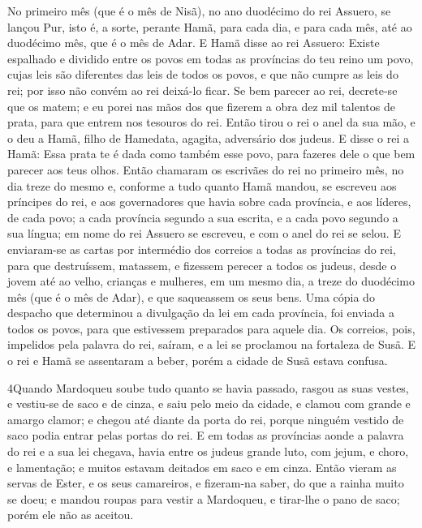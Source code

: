 No primeiro mês (que é o mês de Nisã), no ano duodécimo do rei
Assuero, se lançou Pur, isto é, a sorte, perante Hamã, para cada
dia, e para cada mês, até ao duodécimo mês, que é o mês de Adar.
E Hamã disse ao rei Assuero: Existe espalhado e dividido entre
os povos em todas as províncias do teu reino um povo, cujas leis são
diferentes das leis de todos os povos, e que não cumpre as leis do
rei; por isso não convém ao rei deixá-lo ficar. Se bem parecer
ao rei, decrete-se que os matem; e eu porei nas mãos dos que fizerem
a obra dez mil talentos de prata, para que entrem nos tesouros do
rei. Então tirou o rei o anel da sua mão, e o deu a Hamã,
filho de Hamedata, agagita, adversário dos judeus. E disse o
rei a Hamã: Essa prata te é dada como também esse povo, para fazeres
dele o que bem parecer aos teus olhos. Então chamaram os
escrivães do rei no primeiro mês, no dia treze do mesmo e, conforme
a tudo quanto Hamã mandou, se escreveu aos príncipes do rei, e aos
governadores que havia sobre cada província, e aos líderes, de cada
povo; a cada província segundo a sua escrita, e a cada povo segundo
a sua língua; em nome do rei Assuero se escreveu, e com o anel do
rei se selou. E enviaram-se as cartas por intermédio dos
correios a todas as províncias do rei, para que destruíssem,
matassem, e fizessem perecer a todos os judeus, desde o jovem até ao
velho, crianças e mulheres, em um mesmo dia, a treze do duodécimo
mês (que é o mês de Adar), e que saqueassem os seus bens. Uma
cópia do despacho que determinou a divulgação da lei em cada
província, foi enviada a todos os povos, para que estivessem
preparados para aquele dia. Os correios, pois, impelidos pela
palavra do rei, saíram, e a lei se proclamou na fortaleza de Susã. E
o rei e Hamã se assentaram a beber, porém a cidade de Susã estava
confusa.

\medskip

\lettrine{4} Quando Mardoqueu soube tudo quanto se havia
passado, rasgou as suas vestes, e vestiu-se de saco e de cinza, e
saiu pelo meio da cidade, e clamou com grande e amargo clamor; e
chegou até diante da porta do rei, porque ninguém vestido de saco
podia entrar pelas portas do rei. E em todas as províncias aonde
a palavra do rei e a sua lei chegava, havia entre os judeus grande
luto, com jejum, e choro, e lamentação; e muitos estavam deitados em
saco e em cinza. Então vieram as servas de Ester, e os seus
camareiros, e fizeram-na saber, do que a rainha muito se doeu; e
mandou roupas para vestir a Mardoqueu, e tirar-lhe o pano de saco;
porém ele não as aceitou.

